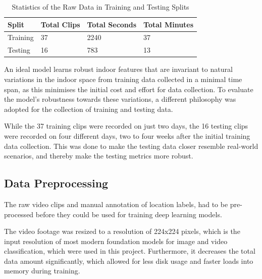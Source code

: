 \documentclass[a4paper]{article}
\begin{document}
  \begin{table}[ht]
    \centering
    \begin{tabular}{llll}
    \toprule
    \bfseries Split & Total Clips & Total Seconds & Total Minutes \\
    \midrule
    Training & 37 &  2240 & 37 \\
    Testing & 16 & 783 & 13 \\
    \bottomrule
    \end{tabular}
    \caption{Statistics of the Raw Data in Training and Testing Splits}
    \label{tab:data-stats}
  \end{table}

  An ideal model learns robust indoor features that are invariant to natural 
  variations in the indoor space from training data collected in a minimal time
  span, as this minimises the initial cost and effort for data collection.
  To evaluate the model's robustness towards these variations, a different
  philosophy was adopted for the collection of training and testing data.

  While the 37 training clips were recorded on just two days, the 16 testing
  clips were recorded on four different days, two to four weeks after the
  initial training data collection. This was done to make the testing data
  closer resemble real-world scenarios, and thereby make the testing metrics
  more robust.
  


  \subsection{Data Preprocessing} %
  \label{sub:data-preprocessing}

  The raw video clips and manual annotation of location labels, had to be
  pre-processed before they could be used for training deep learning models.

  The video footage was resized to a resolution of 224x224 pixels, which is the
  input resolution of most modern foundation models for image and video
  classification, which were used in this project. Furthermore, it decreases the 
  total data amount significantly, which allowed for less disk usage and faster
  loads into memory during training.
\end{document}
